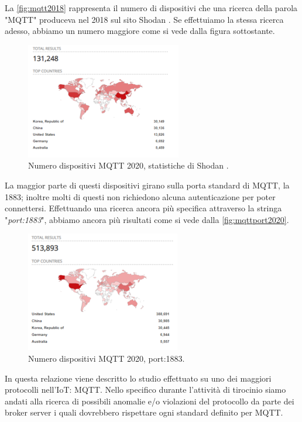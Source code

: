 \documentclass[binding=0.6cm,TFA]{sapthesis}
\begin{document}
\begin{large}
La \autoref{fig:mqtt2018} rappresenta il numero di dispositivi che una ricerca della parola "MQTT" produceva nel 2018 sul sito Shodan \cite{articleAvast}.
Se effettuiamo la stessa ricerca adesso, abbiamo un numero maggiore come si vede dalla figura sottostante.

\begin{figure}[h]
\centering
\includegraphics[scale=0.8]{images/mqtt-2020numbers.png}
\caption{Numero dispositivi MQTT 2020, statistiche di Shodan \cite{shodan}.}
\label{fig:mqtt2020}
\end{figure}

La maggior parte di questi dispositivi girano sulla porta standard di MQTT, la 1883; inoltre molti di questi non richiedono alcuna autenticazione per poter connettersi. Effettuando una ricerca ancora più specifica attraverso la stringa "\textit{port:1883}", abbiamo ancora più risultati come si vede dalla \autoref{fig:mqttport2020}.\\

\begin{figure}[h]
\centering
\includegraphics[scale=0.8]{images/mqtt-2020port.png}
\caption{Numero dispositivi MQTT 2020, port:1883.}
\label{fig:mqttport2020}
\end{figure}

In questa relazione viene descritto lo studio effettuato su uno dei maggiori protocolli nell'IoT: MQTT. Nello specifico durante l'attività di tirocinio siamo andati alla ricerca di possibili anomalie e/o violazioni del protocollo da parte dei broker server i quali dovrebbero rispettare ogni standard definito per MQTT. \\


\end{large}
\end{document}

